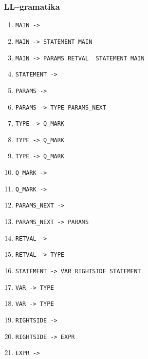 \documentclass[a4paper, 12pt]{article} %
\begin{document}
            {\fontsize{11.3}{13.3}\selectfont
            \subsubsection*{LL--gramatika}\label{llgramatika}
            \begin{enumerate}[noitemsep]
                \item \texttt{MAIN -> }
                \item \texttt{MAIN -> STATEMENT MAIN}
                \item \texttt{{MAIN ->  PARAMS 
                RETVAL } STATEMENT  MAIN }
                \item \texttt{STATEMENT -> \blue{$\epsilon$}}
                \item \texttt{PARAMS -> \blue{$\epsilon$}}
                \item \texttt{PARAMS ->  TYPE PARAMS\_NEXT}
                \item \texttt{TYPE ->  Q\_MARK}
                \item \texttt{TYPE ->  Q\_MARK}
                \item \texttt{TYPE ->  Q\_MARK}
                \item \texttt{Q\_MARK -> \blue{$\epsilon$}}
                \item \texttt{Q\_MARK -> }
                \item \texttt{PARAMS\_NEXT -> \blue{$\epsilon$}}
                \item \texttt{PARAMS\_NEXT ->  PARAMS}
                \item \texttt{RETVAL -> \blue{$\epsilon$}}
                \item \texttt{RETVAL ->  TYPE}
                \item \texttt{STATEMENT -> VAR RIGHTSIDE STATEMENT}
                \item \texttt{VAR ->  TYPE}
                \item \texttt{VAR ->  TYPE}
                \item \texttt{RIGHTSIDE -> \blue{$\epsilon$}}
                \item \texttt{RIGHTSIDE ->  EXPR}
                \item \texttt{EXPR -> }

\end{enumerate}}
\end{document}
